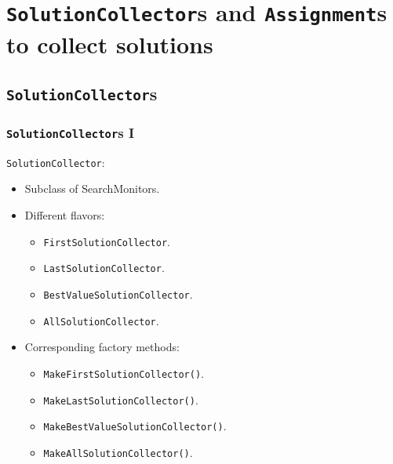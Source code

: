 \documentclass[utf8x,xcolor=dvipsnames]{beamer}
\newcommand{\code}[1]{\texttt{#1}}
\begin{document}
\section{\code{SolutionCollector}s and \code{Assignment}s to collect solutions}

\subsection{\code{SolutionCollector}s}

\begin{frame}[fragile]
\frametitle{\code{SolutionCollector}s I}

\code{SolutionCollector}:

\medskip
\begin{itemize}
 \item<2-> Subclass of SearchMonitors.
 \item<3-> Different flavors:\\
    \begin{itemize}
      \item<4->  \code{FirstSolutionCollector}.
      \item<5->  \code{LastSolutionCollector}.
      \item<6->  \code{BestValueSolutionCollector}.
      \item<7->  \code{AllSolutionCollector}.
    \end{itemize}

 \item<8-> Corresponding factory methods:
    \begin{itemize}
      \item<9->  \code{MakeFirstSolutionCollector()}.
      \item<9->  \code{MakeLastSolutionCollector()}.
      \item<9->  \code{MakeBestValueSolutionCollector()}.
      \item<9->  \code{MakeAllSolutionCollector()}.
    \end{itemize}
 
\end{itemize}

\end{frame}
\end{document}
